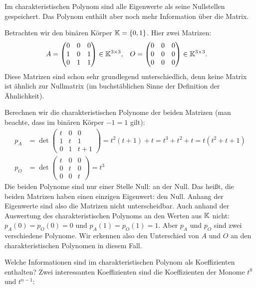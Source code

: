 \begin{bsp}
	Im charakteristischen Polynom sind alle Eigenwerte als seine Nullstellen gespeichert. Das Polynom enthält aber noch mehr Information über die Matrix.  
	
	Betrachten wir den binären Körper $ \mathbb K = \{0,1\}$. Hier zwei Matrizen: 
	\begin{align*}
		 A & = \begin{pmatrix}
		0 & 0 & 0 \\
		1 & 0 & 1 \\
		0 & 1 & 1
	\end{pmatrix} \in \mathbb K^{3 \times 3}, 
	&
	O & = \begin{pmatrix}
		0 & 0 & 0 \\
		0 & 0 & 0 \\
		0 & 0 & 0
	\end{pmatrix} \in \mathbb K^{3 \times 3}. 
	\end{align*}
	Diese Matrizen sind schon sehr grundlegend unterschiedlich, denn keine Matrix ist ähnlich zur Nullmatrix (im buchstäblichen Sinne der Definition der Ähnlichkeit). 
	
	Berechnen wir die charakteristischen Polynome der beiden Matrizen (man beachte, dass im binären Körper $-1=1$ gilt): 
	\begin{align*}
		p_A &= \det\begin{pmatrix}
			t & 0 & 0 \\
			1 & t & 1 \\
			0 & 1 & t+1
		\end{pmatrix} = t^2(t+1) + t = t^3 + t^2 + t = t(t^2 + t + 1) \\
		p_O &= \det\begin{pmatrix}
				t & 0 & 0 \\
				0 & t & 0 \\
				0 & 0 & t
			\end{pmatrix} = t^3
	\end{align*}
	Die beiden Polynome sind nur einer Stelle Null: an der Null. Das heißt, die beiden Matrizen haben einen einzigen Eigenwert: den Null. Anhang der Eigenwerte sind also die Matrizen nicht unterscheidbar. Auch anhand der Auswertung des charakteristischen Polynoms an den Werten aus $\mathbb K$ nicht: $p_A(0) = p_O(0) = 0$ und $p_A(1) = p_O(1) = 1$. Aber $p_A$ und $p_O$ sind zwei verschiedene Polynome. Wir erkennen also den Unterschied von $A$ und $O$ an den charakteristischen Polynomen in diesem Fall. 
\end{bsp}

Welche Informationen sind im charakteristischen Polynom als Koeffizienten enthalten? Zwei interessanten Koeffizienten sind die Koeffizienten der Monome $t^0$ und $t^{n-1}$: 


